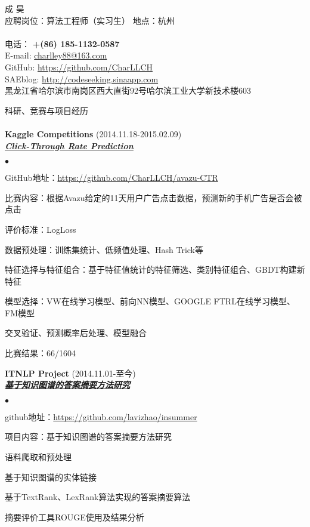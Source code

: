 \documentclass[10pt]{article}
\newcommand{\lineunder}{\vspace*{-8pt} \\ \hspace*{-18pt} \hrulefill \\}
\newcommand{\header}[1]{{\hspace*{-15pt}\vspace*{6pt} \textsc{#1}} \vspace*{-6pt} \lineunder}
\newcommand{\employer}[3]{{ \textbf{#1} (#2)\\ \underline{\textbf{\emph{#3}}}\\  }}
\newcommand{\contact}[3]{
\vspace*{-8pt}
\begin{center}
{\LARGE \scshape {#1}}\\
#2 \lineunder
#3
\end{center}
\vspace*{-8pt}
}
\begin{document}
\newenvironment{achievements}{\begin{list}{$\bullet$}{\topsep 0pt \itemsep -2pt}}{\vspace*{4pt}\end{list}}
\newcommand{\schoolwithcourses}[4]{
 \textbf{#1} #2 $\bullet$ #3\\
\vspace*{5pt}
}
\newcommand{\school}[4]{
 \textbf{#1} #2 $\bullet$ #3\\
#4 \\
}

\small
\smallskip
\vspace*{-44pt}

\contact{\huge 成 昊}
{应聘岗位：算法工程师（实习生）  地点：杭州}
{电话： \textbf{+(86) 185-1132-0587}\\ E-mail: \href{mailto:charlley88@163.com}{charlley88@163.com}\\GitHub: \urlstyle{same}\url{https://github.com/CharLLCH} \\ SAEblog: \urlstyle{same}\url{http://codeseeking.sinaapp.com} \\黑龙江省哈尔滨市南岗区西大直街92号哈尔滨工业大学新技术楼603}

\header{科研、竞赛与项目经历}
\employer{Kaggle Competitions}{2014.11.18-2015.02.09}{Click-Through Rate Prediction}
\begin{achievements}
\item GitHub地址：\url{https://github.com/CharLLCH/avazu-CTR}
	\item 比赛内容：根据Avazu给定的11天用户广告点击数据，预测新的手机广告是否会被点击
	\item 评价标准：LogLoss
	\item 数据预处理：训练集统计、低频值处理、Hash Trick等
	\item 特征选择与特征组合：基于特征值统计的特征筛选、类别特征组合、GBDT构建新特征
	\item 模型选择：VW在线学习模型、前向NN模型、GOOGLE FTRL在线学习模型、FM模型
	\item 交叉验证、预测概率后处理、模型融合
	\item 比赛结果：66/1604
\end{achievements}

\employer{ITNLP Project}{2014.11.01-至今}{基于知识图谱的答案摘要方法研究}
\begin{achievements}
\item github地址：\url{https://github.com/lavizhao/insummer}
	\item 项目内容：基于知识图谱的答案摘要方法研究
	\item 语料爬取和预处理
	\item 基于知识图谱的实体链接
	\item 基于TextRank、LexRank算法实现的答案摘要算法
	\item 摘要评价工具ROUGE使用及结果分析
\end{achievements}
\end{document}
